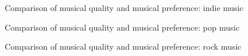 \documentclass[titlepage]{scrartcl}
\begin{document}
    \begin{figure}[H]
        \caption{Comparison of musical quality and musical preference: indie music}
    \end{figure}
    \begin{figure}[H]
        \caption{Comparison of musical quality and musical preference: pop music}
    \end{figure}
    \begin{figure}[H]
        \caption{Comparison of musical quality and musical preference: rock music}
    \end{figure}
\end{document}
